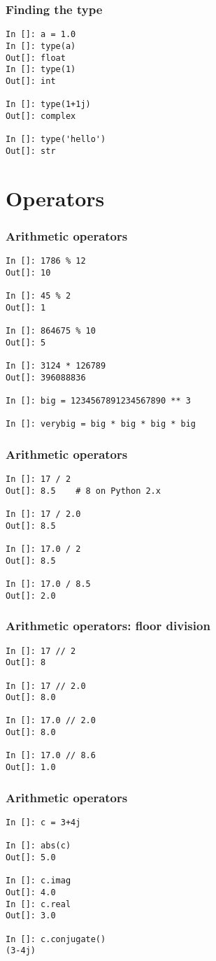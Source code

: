 \documentclass[14pt,compress]{beamer}
\begin{document}
\begin{frame}[fragile]
  \frametitle{Finding the type}
\begin{lstlisting}
In []: a = 1.0
In []: type(a)
Out[]: float
In []: type(1)
Out[]: int

In []: type(1+1j)
Out[]: complex

In []: type('hello')
Out[]: str
\end{lstlisting}
\end{frame}

\section{Operators}

\begin{frame}[fragile]
  \frametitle{Arithmetic operators}
  \small
  \begin{lstlisting}
In []: 1786 % 12
Out[]: 10

In []: 45 % 2
Out[]: 1

In []: 864675 % 10
Out[]: 5

In []: 3124 * 126789
Out[]: 396088836

In []: big = 1234567891234567890 ** 3

In []: verybig = big * big * big * big
  \end{lstlisting}
\end{frame}

\begin{frame}[fragile]
  \frametitle{Arithmetic operators}
  \begin{lstlisting}
In []: 17 / 2
Out[]: 8.5    # 8 on Python 2.x

In []: 17 / 2.0
Out[]: 8.5

In []: 17.0 / 2
Out[]: 8.5

In []: 17.0 / 8.5
Out[]: 2.0
  \end{lstlisting}
\end{frame}

\begin{frame}[fragile]
  \frametitle{Arithmetic operators: floor division}
  \begin{lstlisting}
In []: 17 // 2
Out[]: 8

In []: 17 // 2.0
Out[]: 8.0

In []: 17.0 // 2.0
Out[]: 8.0

In []: 17.0 // 8.6
Out[]: 1.0
  \end{lstlisting}
\end{frame}


\begin{frame}[fragile]
\frametitle{Arithmetic operators}
  \begin{lstlisting}
In []: c = 3+4j

In []: abs(c)
Out[]: 5.0

In []: c.imag
Out[]: 4.0
In []: c.real
Out[]: 3.0

In []: c.conjugate()
(3-4j)
  \end{lstlisting}
\end{frame}
\end{document}
